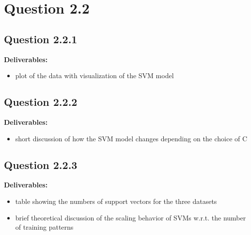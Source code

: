 \section*{Question 2.2}

\subsection*{Question 2.2.1}

\textbf{Deliverables:}

\begin{itemize}
	\item plot of the data with visualization of the SVM model
\end{itemize}


\subsection*{Question 2.2.2}

\textbf{Deliverables:}
\begin{itemize}
	\item short discussion of how the SVM model changes depending on the choice of C
\end{itemize}



\subsection*{Question 2.2.3}

\textbf{Deliverables:}

\begin{itemize}

	\item table showing the numbers of support vectors for the three datasets

	\item brief theoretical discussion of the scaling behavior of SVMs w.r.t. the number of training patterns

\end{itemize}


